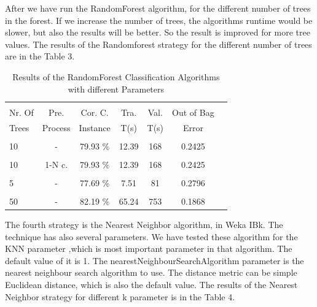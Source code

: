\documentclass[a4paper]{article}
\begin{document}
After we have run the RandomForest algorithm, for the different number of trees
in the forest. If we increase the number of trees, the algorithms runtime would
be slower, but also the results will be better. So the result is improved for
more tree values. The results of the  Randomforest  strategy for the different
number of trees are in the Table 3.


\begin{table}
\begin{tabular}{|l| c | c | c | c |c |c |}

\hline & & & & & \\
Nr. Of & Pre. & Cor. C.& Tra. & Val. & Out of Bag  \\
Trees & Process & Instance & T(s) &  T(s) & Error  \\
\hline & & & & & \\
10	 & - &			79.93  $\%$ & 12.39 & 168 & 0.2425  \\ 
\hline & & & & & \\
10 	 & 1-N c. &	79.93  $\%$ & 12.39 & 168 & 0.2425  \\ 
\hline & & & & & \\
5 	& - &			77.69 $\%$ & 7.51 & 81 & 0.2796   \\ 
\hline & & & & &  \\
50 	 & - &			82.19  $\%$ & 65.24 & 753 &  0.1868 \\ 
\hline
\end{tabular}
\caption{Results of the RandomForest Classification Algorithms with different Parameters}
\end{table}

The fourth strategy is the  Nearest Neighbor algorithm, in Weka IBk. The
technique has also several parameters. We have tested these algorithm for the
KNN parameter ,which is most important parameter in that algorithm. The default
value of it is 1. The nearestNeighbourSearchAlgorithm parameter is the nearest
neighbour search algorithm to use. The distance metric can be simple Euclidean
distance, which is also the default value. The results of the  Nearest Neighbor
strategy for different k parameter is in the Table 4.
\end{document}
